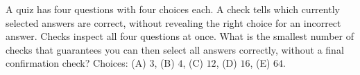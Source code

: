 A quiz has four questions with four choices each. A check tells which currently selected answers are correct, without revealing the right choice for an incorrect answer. Checks inspect all four questions at once. What is the smallest number of checks that guarantees you can then select all answers correctly, without a final confirmation check? Choices: (A) $ 3 $, (B) $ 4 $, (C) $ 12 $, (D) $ 16 $, (E) $ 64 $.
